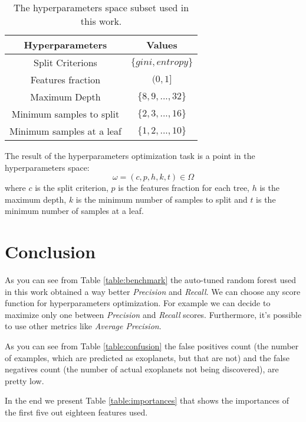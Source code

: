 \documentclass[11pt, a4paper]{article}
\begin{document}
  \begin{table}
    \centering
    \begin{tabular}{|c c|}
      \hline
      Hyperparameters & Values \\
      \hline\hline
      Split Criterions & $\{gini, entropy\}$ \\
      \hline
      Features fraction & $(0, 1]$ \\
      \hline
      Maximum Depth & $\{8,9,...,32\}$ \\
      \hline
      Minimum samples to split & $\{2,3,...,16\}$ \\
      \hline
      Minimum samples at a leaf & $\{1,2,...,10\}$ \\
      \hline
    \end{tabular}
    \caption{The hyperparameters space subset used in this work.}
    \label{table:hyperparameters}
  \end{table}

  The result of the hyperparameters optimization task is a point in the hyperparameters space:
  \[\omega=(c, p, h, k, t)\in\Omega\]
  where $c$ is the split criterion, $p$ is the features fraction for each tree, $h$ is the maximum depth, $k$ is the minimum number of samples to split and $t$ is the minimum number of samples at a leaf.

\section{Conclusion}
  As you can see from Table \ref{table:benchmark} the auto-tuned random forest used in this work obtained a way better \textit{Precision} and \textit{Recall}. We can choose any score function for hyperparameters optimization. For example we can decide to maximize only one between \textit{Precision} and \textit{Recall} scores. Furthermore, it's possible to use other metrics like \textit{Average Precision}.
  
  As you can see from Table \ref{table:confusion} the false positives count (the number of examples, which are predicted as exoplanets, but that are not) and the false negatives count (the number of actual exoplanets not being discovered), are pretty low.

  In the end we present Table \ref{table:importances} that shows the importances of the first five out eighteen features used.
\end{document}
